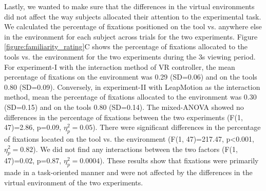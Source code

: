 Lastly, we wanted to make sure that the differences in the virtual environments did not affect the way subjects allocated their attention to the experimental task. We calculated the percentage of fixations positioned on the tool vs. anywhere else in the environment for each subject across trials for the two experiments. Figure \ref{figure:familiarity_rating}C shows the percentage of fixations allocated to the tools vs. the environment for the two experiments during the 3s viewing period. For experiment-I with the interaction method of VR controller, the mean percentage of fixations on the environment was 0.29 (SD=0.06) and on the tools 0.80 (SD=0.09). Conversely, in experiment-II with LeapMotion as the interaction method, mean the percentage of fixations allocated to the environment was 0.30 (SD=0.15) and on the tools 0.80 (SD=0.14). The mixed-ANOVA showed no differences in the percentage of fixations between the two experiments (F(1, 47)=2.86, p=0.09, $\eta_p^2=0.05$). There were significant differences in the percentage of fixations located on the tool vs. the environment (F(1, 47)=217.47, p<0.001, $\eta_p^2=0.82$). We did not find any interactions between the two factors (F(1, 47)=0.02, p=0.87, $\eta_p^2=0.0004$). These results show that fixations were primarily made in a task-oriented manner and were not affected by the differences in the virtual environment of the two experiments.



